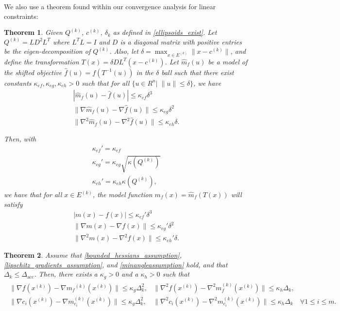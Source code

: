 \documentclass{article}
\newtheorem{theorem}{Theorem}[section]
\theoremstyle{case}
\newcommand{\dacc}{{\Delta_{\text{acc}}}}
\newcommand{\xk}{{x^{(k)}}}
\newcommand{\dk}{\Delta_k}
\newcommand{\mfk}{{{m}_f}^{(k)}}
\newcommand{\qk}{{Q^{(k)}}}
\newcommand{\ck}{{c^{(k)}}}
\newcommand{\sdk}{{\delta_k}}
\newcommand{\ellipsek}{{E^{(k)}}}
\newcommand{\hk}{{\nabla^2m_f^{(k)}(x^{(k)})}}
\newcommand{\gradf}{\nabla f}
\newcommand{\gmcik}{{\nabla m_{c_i}^{(k)}(\xk)}}
\begin{document}
We also use a theorem found within our convergence analysis for linear constraints:
\begin{theorem}
\label{shifted_ellipsoid}
Given $\qk$, $\ck$, $\sdk$ as defined in \cref{ellipsoids_exist}.
Let $\qk = L D^2 L^T$ where $L^TL = I$ and $D$ is a diagonal matrix with positive entries be the eigen-decomposition of $\qk$.
Also, let $\delta = \max_{x\in \ellipsek}\|x-\ck\|$, 
and define the transformation $T(x) = \delta DL^T(x - \ck)$.
Let $\hat m_f(u)$ be a model of the shifted objective $\hat f(u) = f(T^{-1}(u))$ in the $\delta$ ball such that
there exist constants $\kappa_{ef}, \kappa_{eg}, \kappa_{eh} > 0$ such that for all $\{u \in R^n | \;\|u\| \le \delta \}$, we have
\begin{align*}
|\hat m_f(u) - \hat f(u)| \le \kappa_{ef} \delta^3\\
\|\nabla \hat m_f(u) - \nabla \hat f(u)\| \le \kappa_{eg}\delta^2\\
\|\nabla^2 \hat m_f(u) - \nabla^2 \hat f(u)\| \le \kappa_{eh}\delta.
\end{align*}

Then, with
\begin{align*}
\kappa_{ef}' = \kappa_{ef} \\
\kappa_{eg}' = \kappa_{eg}\sqrt{\kappa(\qk)} \\
\kappa_{eh}' = \kappa_{eh}\kappa(\qk),
\end{align*}
we have that for all $x \in \ellipsek$,
the model function $m_f(x) = \hat m_f(T(x))$ will satisfy
\begin{align*}
| m(x) - f(x)| \le \kappa_{ef}'\delta^3 \\
\|\nabla  m(x) - \nabla  f(x)\| \le \kappa_{eg}'\delta^2 \\
\|\nabla^2 m(x) - \nabla^2 f(x)\| \le \kappa_{eh}'\delta.
\end{align*}
\end{theorem}

\begin{theorem}
\label{accuracy_is_satisfied}
Assume that \cref{bounded_hessians_assumption}, \cref{lipschitz_gradients_assumption}, and \cref{minangleassumption} hold, and that $\dk \le \dacc$.
Then, there exists a $\kappa_g>0$ and a $\kappa_h>0$ such that
\begin{align*}
\begin{array}{ccc}
\|\gradf(\xk) - \nabla \mfk(\xk) \| \le \kappa_g \dk^2, & \|\nabla^2 f(\xk) - \hk \| \le \kappa_h \dk, & \\
\|\nabla c_i(\xk) - \gmcik \| \le \kappa_g \dk^2, & \|\nabla^2 c_i(\xk) - \nabla^2 m_{c_i}^{(k)}(\xk) \| \le \kappa_h \dk & \forall 1 \le i \le m. \\
\end{array}
\end{align*}
\end{theorem}
\end{document}
